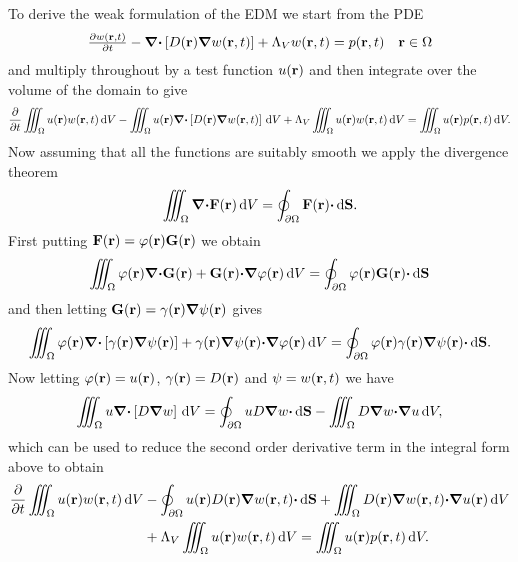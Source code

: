 \documentclass[a4paper]{article}
\numberwithin{equation}{section}
\providecommand\oiint{\oint}
\begin{document}
To derive the weak formulation of the EDM we start from the PDE
\begin{align}
\begin{matrix}
\frac{{\partial}w(\boldsymbol{\mathrm{r}},t)}{{\partial}t}-{\boldsymbol{\mathrm{\nabla}}}{\boldsymbol{\mathrm{\cdot}}}\left[D(\boldsymbol{\mathrm{r}}){\boldsymbol{\mathrm{\nabla}}}w(\boldsymbol{\mathrm{r}},t)\right]+\Lambda_V w(\boldsymbol{\mathrm{r}},t)=p(\boldsymbol{\mathrm{r}},t) &\boldsymbol{\mathrm{r}}\in\Omega 
\end{matrix}
\end{align}
and multiply throughout by a test function $u(\boldsymbol{\mathrm{r}})$ and then integrate over the volume of the domain to give 
\begin{align}
\frac{{\partial}}{{\partial}t}\iiint_{\Omega} u(\boldsymbol{\mathrm{r}}) w(\boldsymbol{\mathrm{r}},t)\,\mathrm{d}{V}
-\iiint_{\Omega} u(\boldsymbol{\mathrm{r}}){\boldsymbol{\mathrm{\nabla}}}{\boldsymbol{\mathrm{\cdot}}}\left[D(\boldsymbol{\mathrm{r}}){\boldsymbol{\mathrm{\nabla}}}w(\boldsymbol{\mathrm{r}},t)\right]\,\mathrm{d}{V}
+\Lambda_V \iiint_{\Omega } u(\boldsymbol{\mathrm{r}}) w(\boldsymbol{\mathrm{r}},t)\,\mathrm{d}{V}
=\iiint_{\Omega} u(\boldsymbol{\mathrm{r}}) p(\boldsymbol{\mathrm{r}},t)\,\mathrm{d}{V}.
\end{align}
Now assuming that all the functions are suitably smooth we apply the divergence
theorem
\begin{align}
\iiint_{\Omega} {\vnabla}{\vcdot}\vF\pr\dif{V} = \oiint_{\partial\Omega}\vF\pr{\vcdot}\dif{\vS}.
\end{align}
First putting $\boldsymbol{\mathrm{F}}(\boldsymbol{\mathrm{r}})=\varphi(\boldsymbol{\mathrm{r}})\boldsymbol{\mathrm{G}}(\boldsymbol{\mathrm{r}})$ we obtain
\begin{align}
\iiint_{\Omega} \varphi\pr{\vnabla}{\vcdot}\vG\pr+\vG\pr{\vcdot}{\vnabla}\varphi\pr\dif{V}
=\oiint_{\partial\Omega } \varphi\pr\vG\pr{\vcdot}\dif{\vS}
\end{align}
and then letting $\boldsymbol{\mathrm{G}}(\boldsymbol{\mathrm{r}})=\gamma(\boldsymbol{\mathrm{r}}){\boldsymbol{\mathrm{\nabla}}}\psi(\boldsymbol{\mathrm{r}})$ gives
\begin{align}
\iiint_{\Omega} \varphi\pr{\vnabla}{\vcdot}\left[\gamma\pr{\vnabla}\psi\pr\right]+\gamma\pr{\vnabla}\psi\pr{\vcdot}{\vnabla}\varphi\pr\dif{V}
=\oiint_{\partial\Omega }\varphi\pr\gamma\pr{\vnabla}\psi\pr{\vcdot}\dif{\vS}.
\end{align}
Now letting $\varphi(\boldsymbol{\mathrm{r}})=u(\boldsymbol{\mathrm{r}})$, $\gamma(\boldsymbol{\mathrm{r}})=D(\boldsymbol{\mathrm{r}})$ and $\psi=w(\boldsymbol{\mathrm{r}},t)$ we have
\begin{align}
\iiint_{\Omega} u{\vnabla}{\vcdot}\left[D{\vnabla}w\right]\dif{V}
=\oiint_{\partial\Omega } uD{\vnabla}w{\vcdot}\dif{\vS}
-\iiint_{\Omega} D{\vnabla}w{\vcdot}{\vnabla}u\dif{V},
\end{align}
which can be used to reduce the second order derivative term in the integral form above to obtain
\begin{align}
\frac{{\partial}}{{\partial}t}\iiint_{\Omega} u\pr w\prt\dif{V}
&-\oiint_{\partial\Omega} u\pr D\pr {\vnabla}w\prt{\vcdot}\dif{\vS}
+\iiint_{\Omega} D\pr{\vnabla}w\prt{\vcdot}{\vnabla}u\pr\dif{V} \nonumber\\
&+\Lambda_V \iiint_{\Omega} u\pr w\prt\dif{V}
=\iiint_{\Omega} u\pr p\prt\dif{V}.
\end{align}
\end{document}
